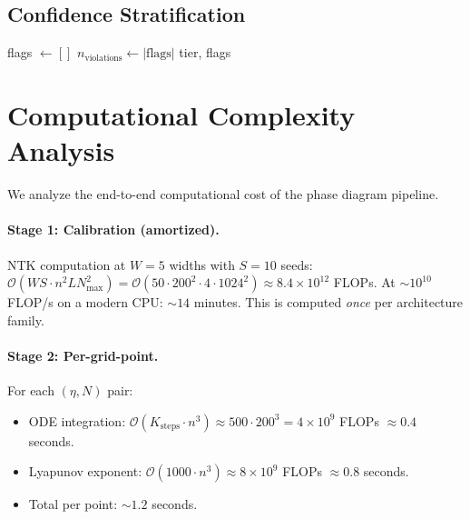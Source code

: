\documentclass[11pt]{article}
\theoremstyle{definition}
\newcommand{\cO}{\mathcal{O}}
\begin{document}
\subsection{Confidence Stratification}
\label{sec:alg-confidence}

\begin{algorithm}[H]
\caption{Confidence Stratification}
\label{alg:confidence}
\DontPrintSemicolon
{}
\BlankLine
flags $\gets []$ \;
\BlankLine
$n_{\mathrm{violations}} \gets |\text{flags}|$ \;
\Return tier, flags
\end{algorithm}

\section{Computational Complexity Analysis}
\label{sec:complexity}

We analyze the end-to-end computational cost of the phase diagram pipeline.

\paragraph{Stage 1: Calibration (amortized).} NTK computation at $W = 5$ widths with $S = 10$ seeds: $\cO(WS \cdot n^2 L N_{\max}^2) = \cO(50 \cdot 200^2 \cdot 4 \cdot 1024^2) \approx 8.4 \times 10^{12}$ FLOPs. At $\sim 10^{10}$ FLOP/s on a modern CPU: $\sim 14$ minutes. This is computed \emph{once} per architecture family.

\paragraph{Stage 2: Per-grid-point.} For each $(\eta, N)$ pair:
\begin{itemize}[leftmargin=*,itemsep=0pt]
\item ODE integration: $\cO(K_{\mathrm{steps}} \cdot n^3) \approx 500 \cdot 200^3 = 4 \times 10^9$ FLOPs $\approx 0.4$ seconds.
\item Lyapunov exponent: $\cO(1000 \cdot n^3) \approx 8 \times 10^9$ FLOPs $\approx 0.8$ seconds.
\item Total per point: $\sim 1.2$ seconds.
\end{itemize}
\end{document}
